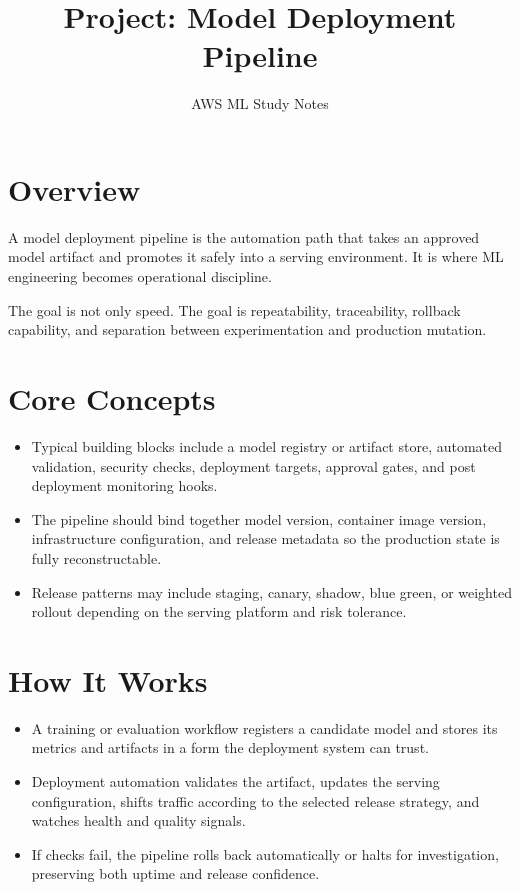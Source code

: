 \documentclass[10pt,twocolumn]{article}
\begin{document}
\title{\vspace{-1.6cm}Project: Model Deployment Pipeline}
\author{AWS ML Study Notes}
\date{}
\maketitle
\small

\section*{Overview}
A model deployment pipeline is the automation path that takes an approved model artifact and promotes it safely into a serving environment. It is where ML engineering becomes operational discipline.

The goal is not only speed. The goal is repeatability, traceability, rollback capability, and separation between experimentation and production mutation.

\section*{Core Concepts}
\begin{itemize}
\item Typical building blocks include a model registry or artifact store, automated validation, security checks, deployment targets, approval gates, and post deployment monitoring hooks.
\item The pipeline should bind together model version, container image version, infrastructure configuration, and release metadata so the production state is fully reconstructable.
\item Release patterns may include staging, canary, shadow, blue green, or weighted rollout depending on the serving platform and risk tolerance.
\end{itemize}

\section*{How It Works}
\begin{itemize}
\item A training or evaluation workflow registers a candidate model and stores its metrics and artifacts in a form the deployment system can trust.
\item Deployment automation validates the artifact, updates the serving configuration, shifts traffic according to the selected release strategy, and watches health and quality signals.
\item If checks fail, the pipeline rolls back automatically or halts for investigation, preserving both uptime and release confidence.
\end{itemize}
\end{document}
